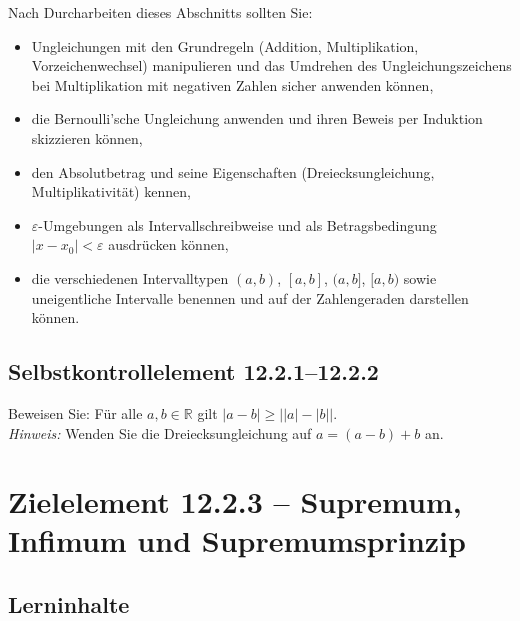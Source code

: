 \documentclass[a4paper,12pt]{article}
\begin{document}
Nach Durcharbeiten dieses Abschnitts sollten Sie:
\begin{itemize}
  \item Ungleichungen mit den Grundregeln (Addition, Multiplikation, Vorzeichenwechsel)
        manipulieren und das Umdrehen des Ungleichungszeichens bei Multiplikation mit negativen
        Zahlen sicher anwenden können,
  \item die Bernoulli'sche Ungleichung anwenden und ihren Beweis per Induktion skizzieren können,
  \item den Absolutbetrag und seine Eigenschaften (Dreiecksungleichung, Multiplikativität) kennen,
  \item $\varepsilon$-Umgebungen als Intervallschreibweise und als Betragsbedingung
        $|x - x_0| < \varepsilon$ ausdrücken können,
  \item die verschiedenen Intervalltypen $(a,b)$, $[a,b]$, $(a,b]$, $[a,b)$ sowie
        uneigentliche Intervalle benennen und auf der Zahlengeraden darstellen können.
\end{itemize}

\subsection*{Selbstkontrollelement 12.2.1--12.2.2}

Beweisen Sie: Für alle $a, b \in \mathbb{R}$ gilt $|a - b| \geq \bigl||a| - |b|\bigr|$.\\
\emph{Hinweis:} Wenden Sie die Dreiecksungleichung auf $a = (a-b)+b$ an.

\newpage

\section*{Zielelement 12.2.3 -- Supremum, Infimum und Supremumsprinzip}

\subsection*{Lerninhalte}
\end{document}
